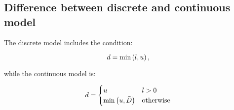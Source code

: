 \subsection{\label{sub:Difference-between-discrete}Difference between discrete
and continuous model}

The discrete model includes the condition:

\[
d=\min\left(l,u\right),
\]


while the continuous model is:

\[
d=\begin{cases}
u & l>0\\
\min\left(u,\bar{D}\right) & \text{otherwise}
\end{cases}
\]


